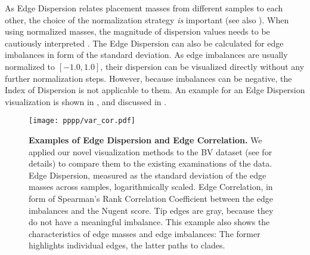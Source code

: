 As Edge Dispersion relates placement masses from different samples to each other,
the choice of the normalization strategy {\em is} important
(see also ).
When using normalized masses, the magnitude of dispersion values needs to be cautiously interpreted \cite{Lovell2015}.
The Edge Dispersion can also be calculated for edge imbalances in form of the standard deviation.
As edge imbalances are usually normalized to $[ -1.0, 1.0 ]$,
their dispersion can be visualized directly without any further normalization steps.
However, because imbalances can be negative, the Index of Dispersion is not applicable to them.
An example for an Edge Dispersion visualization is shown in ,
and discussed in .

\begin{figure}[!ht]
    \centering
    \texttt{[image: pppp/var\_cor.pdf]}
    \begin{subfigure}{0pt}
        \label{fig:var_cor:sub:em_varl}
    \end{subfigure}
    \begin{subfigure}{0pt}
        \label{fig:var_cor:sub:ei_var}
    \end{subfigure}
    \caption[Examples of Edge Dispersion and Edge Correlation]{
        \textbf{Examples of Edge Dispersion and Edge Correlation.}
        We applied our novel visualization methods to the \acf{BV} dataset
        (see  for details)
        to compare them to the existing examinations of the data.
        Edge Dispersion, measured as the standard deviation of the edge masses across samples, logarithmically scaled.
        Edge Correlation, in form of Spearman's Rank Correlation Coefficient
        between the edge imbalances and the Nugent score.
        Tip edges are gray, because they do not have a meaningful imbalance.
        This example also shows the characteristics of edge masses and edge imbalances:
        The former highlights individual edges, the latter paths to clades.
    }
    \label{fig:var_cor}
\end{figure}

